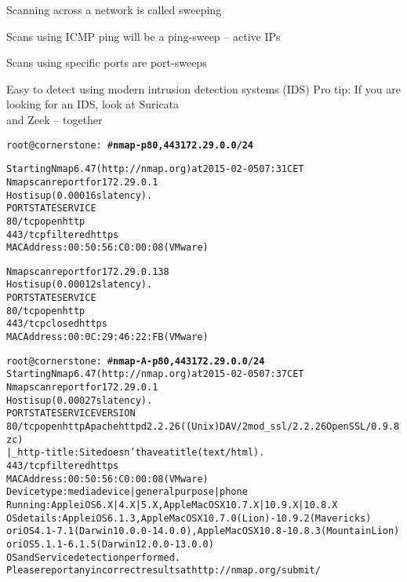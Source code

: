 \documentclass[Screen16to9,17pt]{foils}
\begin{document}

\begin{list1}
\item Scanning across a network is called sweeping
\item Scans using ICMP ping will be a ping-sweep -- active IPs
\item Scans using specific ports are port-sweeps
\item Easy to detect using modern intrusion detection systems (IDS)
\vskip 2cm
Pro tip: If you are looking for an IDS, look at Suricata \\
and Zeek  -- together
\end{list1}


\begin{alltt}\small
root@cornerstone:~#{\bfseries  nmap -p80,443 172.29.0.0/24}

Starting Nmap 6.47 ( http://nmap.org ) at 2015-02-05 07:31 CET
Nmap scan report for 172.29.0.1
Host is up (0.00016s latency).
PORT    STATE    SERVICE
{\color{darkgreen}80/tcp  open     http}
443/tcp filtered https
MAC Address: 00:50:56:C0:00:08 (VMware)

Nmap scan report for 172.29.0.138
Host is up (0.00012s latency).
PORT    STATE  SERVICE
{\color{darkgreen}80/tcp  open   http}
443/tcp closed https
MAC Address: 00:0C:29:46:22:FB (VMware)

\end{alltt}



\begin{alltt}\footnotesize
root@cornerstone:~#{\bfseries nmap -A -p80,443 172.29.0.0/24}
Starting Nmap 6.47 ( http://nmap.org ) at 2015-02-05 07:37 CET
Nmap scan report for 172.29.0.1
Host is up (0.00027s latency).
PORT    STATE    SERVICE VERSION
80/tcp  open     http    Apache httpd 2.2.26 ((Unix) DAV/2 mod_ssl/2.2.26 OpenSSL/0.9.8zc)
|_http-title: Site doesn't have a title (text/html).
443/tcp filtered https
MAC Address: 00:50:56:C0:00:08 (VMware)
Device type: media device|general purpose|phone
Running: Apple iOS 6.X|4.X|5.X, Apple Mac OS X 10.7.X|10.9.X|10.8.X
OS details: Apple iOS 6.1.3, Apple Mac OS X 10.7.0 (Lion) - 10.9.2 (Mavericks)
or iOS 4.1 - 7.1 (Darwin 10.0.0 - 14.0.0), Apple Mac OS X 10.8 - 10.8.3 (Mountain Lion)
or iOS 5.1.1 - 6.1.5 (Darwin 12.0.0 - 13.0.0)
OS and Service detection performed.
Please report any incorrect results at http://nmap.org/submit/
\end{alltt}
\end{document}
